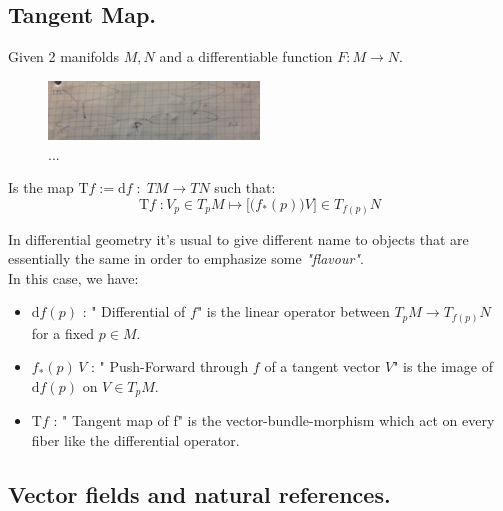 \documentclass[a4paper,12pt]{scrartcl}    %
\begin{document}
\subsection{Tangent Map.}
Given 2 manifolds $M,N$ and a differentiable function $F:M\rightarrow N$.

\begin{figure}[h!]
  \caption{...}\label{fig:TangentMap}
  	\includegraphics[width=0.5\textwidth]{TempPictures/TangentMap.jpg}
  \centering
\end{figure}

\begin{definition}
Is the map $\textrm{T}f := \textrm{d}f \; : \; TM \rightarrow TN$ such that:
\begin{displaymath}
\textrm{T}f \; : V_p \in T_pM \mapsto \big[ \big( f_*(p) \big) V \big] \in T_{f(p)}N
\end{displaymath}

\end{definition}

\begin{observation}
In differential geometry it's usual to give different name to objects that are essentially the same in order to emphasize some \emph{"flavour"}.
\\
In this case, we have:
\begin{itemize}
\item $\textrm{d}f(p)$ : " Differential of $f$" is the linear operator between $T_pM \rightarrow T_{f(p)}N$ for a fixed $p\in M$.

\item $f_*(p)\, V$ : " Push-Forward through $f$ of a tangent vector $V$"  is the image of $\textrm{d}f(p)$ on $V\in T_pM$.

\item $\textrm{T}f$ : " Tangent map of f" is the vector-bundle-morphism which act on every fiber like the differential operator.

\end{itemize}

\end{observation}


\subsection{Vector fields and natural references.}
\end{document}
